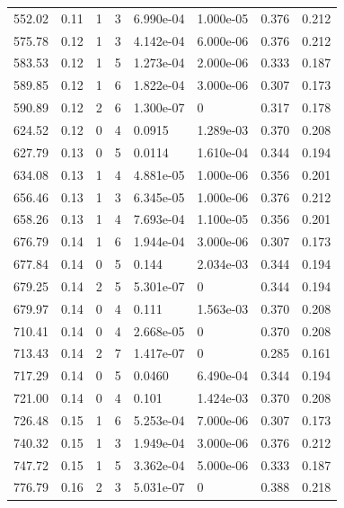 \documentclass[preview]{standalone}
\begin{document}
{{{\begin{tabular}{L{1.2cm}C{1.2cm} C{0.3cm}C{0.5cm} C{1.4cm}C{1.4cm} C{1.4cm}C{1.4cm}}
  552.02  &  0.11  & 1     &  3 &  6.990e-04  & 1.000e-05  & 0.376 &  0.212   \\ 
  575.78  &  0.12  & 1     &  3 &  4.142e-04  & 6.000e-06  & 0.376 &  0.212   \\ 
  583.53  &  0.12  & 1     &  5 &  1.273e-04  & 2.000e-06  & 0.333 &  0.187   \\ 
  589.85  &  0.12  & 1     &  6 &  1.822e-04  & 3.000e-06  & 0.307 &  0.173   \\ 
  590.89  &  0.12  & 2     &  6 &  1.300e-07  & 0  & 0.317 &  0.178   \\ 
  624.52  &  0.12  & 0     &  4 &  0.0915  & 1.289e-03  & 0.370 &  0.208   \\ 
  627.79  &  0.13  & 0     &  5 &  0.0114  & 1.610e-04  & 0.344 &  0.194   \\ 
  634.08  &  0.13  & 1     &  4 &  4.881e-05  & 1.000e-06  & 0.356 &  0.201   \\ 
  656.46  &  0.13  & 1     &  3 &  6.345e-05  & 1.000e-06  & 0.376 &  0.212   \\ 
  658.26  &  0.13  & 1     &  4 &  7.693e-04  & 1.100e-05  & 0.356 &  0.201   \\ 
  676.79  &  0.14  & 1     &  6 &  1.944e-04  & 3.000e-06  & 0.307 &  0.173   \\ 
  677.84  &  0.14  & 0     &  5 &  0.144  & 2.034e-03  & 0.344 &  0.194   \\ 
  679.25  &  0.14  & 2     &  5 &  5.301e-07  & 0  & 0.344 &  0.194   \\ 
  679.97  &  0.14  & 0     &  4 &  0.111  & 1.563e-03  & 0.370 &  0.208   \\ 
  710.41  &  0.14  & 0     &  4 &  2.668e-05  & 0  & 0.370 &  0.208   \\ 
  713.43  &  0.14  & 2     &  7 &  1.417e-07  & 0  & 0.285 &  0.161   \\ 
  717.29  &  0.14  & 0     &  5 &  0.0460  & 6.490e-04  & 0.344 &  0.194   \\ 
  721.00  &  0.14  & 0     &  4 &  0.101  & 1.424e-03  & 0.370 &  0.208   \\ 
  726.48  &  0.15  & 1     &  6 &  5.253e-04  & 7.000e-06  & 0.307 &  0.173   \\ 
  740.32  &  0.15  & 1     &  3 &  1.949e-04  & 3.000e-06  & 0.376 &  0.212   \\ 
  747.72  &  0.15  & 1     &  5 &  3.362e-04  & 5.000e-06  & 0.333 &  0.187   \\ 
  776.79  &  0.16  & 2     &  3 &  5.031e-07  & 0  & 0.388 &  0.218   \\ 

\end{tabular}}}}
\end{document}
